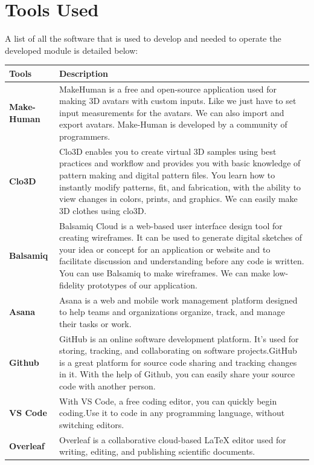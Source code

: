 \section{Tools Used}
A list of all the software that is used to develop and needed to operate the developed module is detailed below:
\begin{table}[H]
    \centering
   \begin{tabular}{ | m{7em} | m{11cm}|}  
  \hline  \textbf{Tools} &  \textbf{Description}  \\  \hline
 \textbf{Make-Human} & MakeHuman is a free and open-source application used for making 3D avatars with custom inputs. Like we just have to set input measurements for the avatars. We can also import and export avatars. Make-Human is developed by a community of programmers.
  \\  \hline
 \textbf{Clo3D} & Clo3D enables you to create virtual 3D samples using best practices and workflow and provides you with basic knowledge of pattern making and digital pattern files. You learn how to instantly modify patterns, fit, and fabrication, with the ability to view changes in colors, prints, and graphics. We can easily make 3D clothes using clo3D.
    \\  \hline
\textbf{ Balsamiq} & Balsamiq Cloud is a web-based user interface design tool for creating wireframes. It can be used to generate digital sketches of your idea or concept for an application or website and to facilitate discussion and understanding before any code is written. You can use Balsamiq to make wireframes. We can make low-fidelity prototypes of our application.
    \\  \hline
 \textbf{ Asana} & Asana is a web and mobile work management platform designed to help teams and organizations organize, track, and manage their tasks or work. 
    \\  \hline
 \textbf{ Github} & GitHub is an online software development platform. It's used for storing, tracking, and collaborating on software projects.GitHub is a great platform for source code sharing and tracking changes in it. With the help of Github, you can easily share your source code with another person.
    \\  \hline
   \textbf{ VS Code} & With VS Code, a free coding editor, you can quickly begin coding.Use it to code in any programming language, without switching editors.
        \\  \hline
    \textbf{Overleaf} & Overleaf is a collaborative cloud-based LaTeX editor used for writing, editing, and publishing scientific documents.

\end{tabular}
\end{table}
